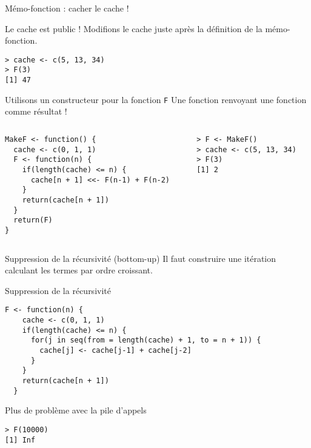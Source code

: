 \documentclass[10pt]{beamer}
\begin{document}
\begin{frame}[fragile]{Mémo-fonction : cacher le cache !}
  \begin{block}{Le cache est public !}
    Modifions le cache juste après la définition de la mémo-fonction.
\begin{lstlisting}
> cache <- c(5, 13, 34)
> F(3)
[1] 47
\end{lstlisting}
\end{block}
\begin{block}{Utilisons un constructeur pour la fonction \texttt{F}}
  Une fonction renvoyant une fonction comme résultat !

\begin{columns}[t]
\begin{column}{0.55\textwidth}
\begin{lstlisting}[style=editor]
MakeF <- function() {
  cache <- c(0, 1, 1)
  F <- function(n) {
    if(length(cache) <= n) {
      cache[n + 1] <<- F(n-1) + F(n-2)
    }
    return(cache[n + 1])
  }
  return(F)
}
  \end{lstlisting}
\end{column}
\begin{column}{0.45\textwidth}
  \begin{lstlisting}
> F <- MakeF()
> cache <- c(5, 13, 34)
> F(3)
[1] 2
  \end{lstlisting}
\end{column}
\end{columns}
\end{block}
\end{frame}


\begin{frame}[fragile]{Suppression de la récursivité (bottom-up)}
  Il faut construire une itération calculant les termes par ordre croissant.
  \begin{alertblock}{Suppression de la récursivité}
    \begin{lstlisting}[style=edblock]
F <- function(n) {
    cache <- c(0, 1, 1)
    if(length(cache) <= n) {
      for(j in seq(from = length(cache) + 1, to = n + 1)) {
        cache[j] <- cache[j-1] + cache[j-2]
      }
    }
    return(cache[n + 1])
  }
    \end{lstlisting}
  \end{alertblock}


  \begin{exampleblock}{Plus de problème avec la pile d'appels}
    \begin{lstlisting}[style=block]
> F(10000)
[1] Inf
    \end{lstlisting}
  \end{exampleblock}

\end{frame}
\end{document}
